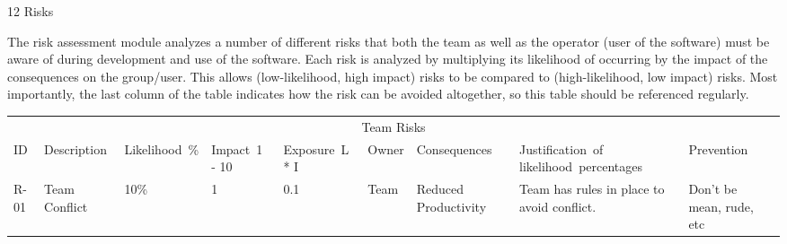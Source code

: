 12 Risks

The risk assessment module analyzes a number of different risks that both the team as well as the operator (user of the software) must be aware of during development and use of the software. Each risk is analyzed by multiplying its likelihood of occurring by the impact of the consequences on the group/user. This allows (low-likelihood, high impact) risks to be compared to (high-likelihood, low impact) risks. Most importantly, the last column of the table indicates how the risk can be avoided altogether, so this table should be referenced regularly.


\begin{table}
    \centering
    \begin{tabular}{lllllllll}
        \multicolumn{9}{c}{Team Risks}                                                                                                                                                                                                                                                                                                                                                                                                                                                                                                                                                                                                       \\
        ID   & Description                                                                & Likelihood~\% & Impact~1 - 10 & Exposure~L * I & Owner               & Consequences                                                                                 & Justification~of likelihood~percentages                                                                                                                                                                                                                                & Prevention                                                                                        \\
        R-01 & Team Conflict                                                              & 10\%          & 1             & 0.1            & Team                & Reduced Productivity                                                                         & Team has rules in place to avoid conflict.                                                                                                                                                                                                                             & Don’t be mean, rude, etc                                                                          \\

\end{tabular}
\end{table}
